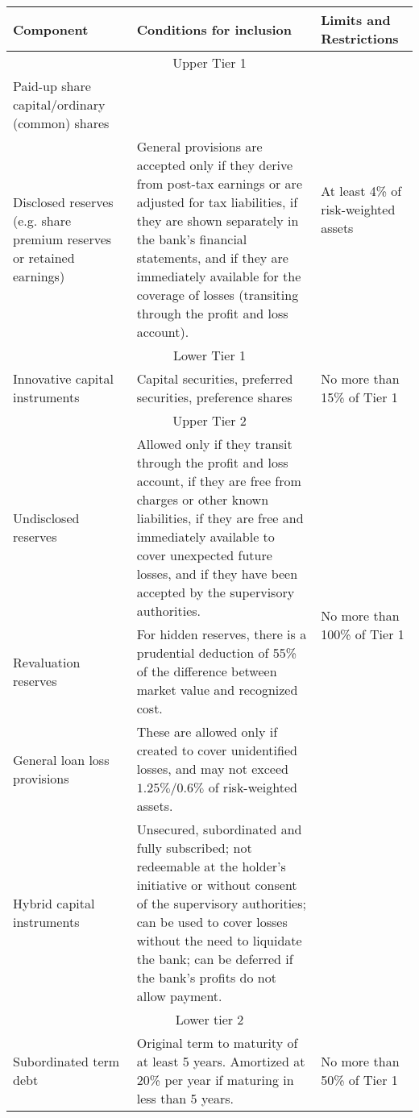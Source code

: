 \documentclass[12pt]{article}
\begin{document}
\begin{table}
\begin{tabular}{|p{3cm}|p{8cm}|p{3cm}|}
    \toprule
    \textbf{Component} & \textbf{Conditions for inclusion} & \textbf{Limits and Restrictions} \\
    \midrule
    \multicolumn{3}{|c|}{Upper Tier 1} \\
    \hline
    Paid-up share capital/ordinary (common) shares &  & \multirow{2}{3cm}{At least 4\% of risk-weighted assets} \\ \cline{1-2}
    Disclosed reserves (e.g. share premium reserves or retained earnings) & General provisions are accepted only if they derive from post-tax earnings or are adjusted for tax liabilities, if they are shown separately in the bank’s financial statements, and if they are immediately available for the coverage of losses (transiting through the profit and loss account). & \\
    \hline
    \multicolumn{3}{|c|}{Lower Tier 1} \\
    \hline
    Innovative capital instruments & Capital securities, preferred securities, preference shares & No more than 15\% of Tier 1 \\
    \hline
    \multicolumn{3}{|c|}{Upper Tier 2} \\
    \hline
    Undisclosed reserves & Allowed only if they transit through the profit and loss account, if they are free from charges or other known liabilities, if they are free and immediately available to cover unexpected future losses, and if they have been accepted by the supervisory authorities. & \multirow{3}{3cm}{No more than 100\% of Tier 1} \\ \cline{1-2}
    Revaluation reserves & For hidden reserves, there is a prudential deduction of 55\% of the difference between market value and recognized cost. & \\ \cline{1-2}
    General loan loss provisions & These are allowed only if created to cover unidentified losses, and may not exceed \(1.25\%/0.6\%\) of risk-weighted assets. & \\ \hline
    Hybrid capital instruments & Unsecured, subordinated and fully subscribed; not redeemable at the holder’s initiative or without consent of the supervisory authorities; can be used to cover losses without the need to liquidate the bank; can be deferred if the bank’s profits do not allow payment. & \\
    \hline
    \multicolumn{3}{|c|}{Lower tier 2} \\
    \hline
    Subordinated term debt & Original term to maturity of at least 5 years. Amortized at 20\% per year if maturing in less than 5 years. & No more than 50\% of Tier 1 \\
    \bottomrule
  \end{tabular}
\end{table}

\FloatBarrier


\end{document}
